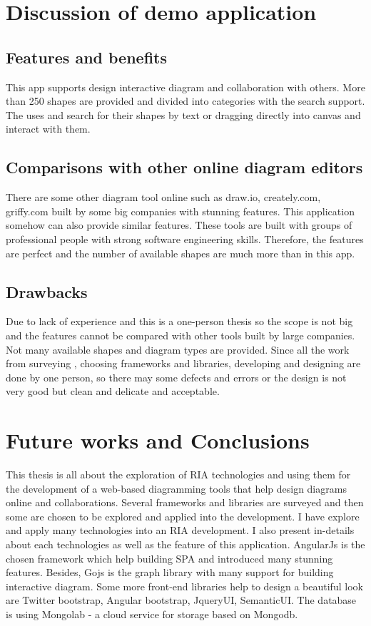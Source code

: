 \documentclass[14pt,a4paper]{extreport}
\begin{document}
	\section{Discussion of demo application}
		\subsection{Features and benefits}
			This app supports design interactive diagram and collaboration with others. More than 250 shapes are provided and divided into categories with the search support. The uses and search for their shapes by text or dragging directly into canvas and interact with them. 
		\subsection{Comparisons with other online diagram editors}
			There are some other diagram tool online such as draw.io, creately.com, griffy.com built by some big companies with stunning features. This application somehow can also provide similar features. These tools are built with groups of professional people with strong software engineering skills. Therefore, the features are perfect and the number of available shapes are much more than in this app. 
		\subsection{Drawbacks}
			Due to lack of experience and this is a one-person thesis so the scope is not big and the features cannot be compared with other tools built by large companies. Not many available shapes and diagram types are provided. Since all the work from surveying , choosing frameworks and libraries, developing and designing are done by one person, so there may some defects and errors or the design is not very good but clean and delicate and acceptable. 
	\section{Future works and Conclusions}
		This thesis is all about the exploration of RIA technologies and using them for the development of a web-based diagramming tools that help design diagrams online and collaborations. Several frameworks and libraries are surveyed and then some are chosen to be explored and applied into the development. I have explore and apply many technologies into an RIA development. I also present in-details about each technologies as well as the feature of this application. AngularJs is the chosen framework which help building SPA and introduced many stunning features. Besides, Gojs is the graph library with many support for building interactive diagram. Some more front-end libraries help to design a beautiful look are Twitter bootstrap, Angular bootstrap, JqueryUI, SemanticUI. The database is using Mongolab - a cloud service for storage based on Mongodb.
		  
\end{document}
